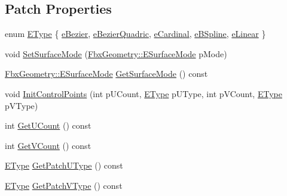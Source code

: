 \subsection*{Patch Properties}
\begin{DoxyCompactItemize}
\item 
enum \hyperlink{class_fbx_patch_ad669936e6b844a7a15fa30ec7c183fbb}{E\+Type} \{ \newline
\hyperlink{class_fbx_patch_ad669936e6b844a7a15fa30ec7c183fbba39802d4bc9ffba384319ea9f6fd83120}{e\+Bezier}, 
\hyperlink{class_fbx_patch_ad669936e6b844a7a15fa30ec7c183fbbad9a258a7f38618194aa9757f45c3de5d}{e\+Bezier\+Quadric}, 
\hyperlink{class_fbx_patch_ad669936e6b844a7a15fa30ec7c183fbbacd160ac078c87d9a387e2f6f308baef6}{e\+Cardinal}, 
\hyperlink{class_fbx_patch_ad669936e6b844a7a15fa30ec7c183fbba16f667e030afd210591ddf3227697e87}{e\+B\+Spline}, 
\newline
\hyperlink{class_fbx_patch_ad669936e6b844a7a15fa30ec7c183fbbaf29ac7b876a0bf9e187e2790195d9339}{e\+Linear}
 \}
\item 
void \hyperlink{class_fbx_patch_abe0a63e804147816c6d6b7733b7de6dd}{Set\+Surface\+Mode} (\hyperlink{class_fbx_geometry_adb9d2e34481a2cb40f1d783c665794db}{Fbx\+Geometry\+::\+E\+Surface\+Mode} p\+Mode)
\item 
\hyperlink{class_fbx_geometry_adb9d2e34481a2cb40f1d783c665794db}{Fbx\+Geometry\+::\+E\+Surface\+Mode} \hyperlink{class_fbx_patch_a0621b866f54824bdccdbae5ae2a58e28}{Get\+Surface\+Mode} () const
\item 
void \hyperlink{class_fbx_patch_a5dea472db8e81e1f249120a9c2d86277}{Init\+Control\+Points} (int p\+U\+Count, \hyperlink{class_fbx_patch_ad669936e6b844a7a15fa30ec7c183fbb}{E\+Type} p\+U\+Type, int p\+V\+Count, \hyperlink{class_fbx_patch_ad669936e6b844a7a15fa30ec7c183fbb}{E\+Type} p\+V\+Type)
\item 
int \hyperlink{class_fbx_patch_a4b9ff1fdd6b7ec569f37f4f56a4bb926}{Get\+U\+Count} () const
\item 
int \hyperlink{class_fbx_patch_ad2c56fe0035f645367c4184c8c051044}{Get\+V\+Count} () const
\item 
\hyperlink{class_fbx_patch_ad669936e6b844a7a15fa30ec7c183fbb}{E\+Type} \hyperlink{class_fbx_patch_ab67355654d2257bffdd2a686b2da4096}{Get\+Patch\+U\+Type} () const
\item 
\hyperlink{class_fbx_patch_ad669936e6b844a7a15fa30ec7c183fbb}{E\+Type} \hyperlink{class_fbx_patch_ad3648b3dedde60e7b0c9d0691c96de42}{Get\+Patch\+V\+Type} () const
\item 

\end{DoxyCompactItemize}
